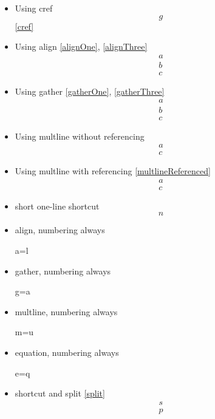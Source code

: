 \documentclass{article}
\begin{document}
\begin{itemize}
		\item Using cref
			\begin{equation}\label{cref}
				g
			\end{equation}
			\cref{cref}
		\item Using align \ref{alignOne}, \ref{alignThree}
			\begin{align}
				a\label{alignOne}\\
				b\label{alignTwo}\\
				c\label{alignThree}
			\end{align}
		\item Using gather \ref{gatherOne}, \ref{gatherThree}
			\begin{gather}
				a\label{gatherOne}\\
				b\label{gatherTwo}\\
				c\label{gatherThree}
			\end{gather}
		\item Using multline without referencing
			\begin{multline}
				a\\
				c\label{multlineUnreferenced}
			\end{multline}
		\item Using multline with referencing \ref{multlineReferenced}
			\begin{multline}
				a\\
				c\label{multlineReferenced}
			\end{multline}
		\item short one-line shortcut \[n\]
		\item align, numbering always \begin{align+} a=l \end{align+}
		\item gather, numbering always \begin{gather+} g=a \end{gather+}
		\item multline, numbering always \begin{multline+} m=u \end{multline+}
		\item equation, numbering always \begin{equation+} e=q \end{equation+}
		\item shortcut and split \ref{split} \[ \label{split}\begin{split} s \\ p \end{split} \]

\end{itemize}
\end{document}
